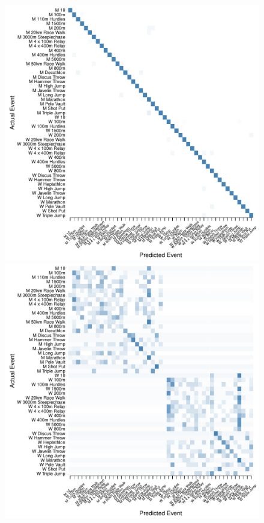 \begin{figure}
\begin{center}
\begin{minipage}{0.20\textwidth}
\begin{center}
    \end{center}
  \end{minipage}
    \hspace{0.05\textwidth}
    \begin{minipage}{0.20\textwidth}
    \begin{center}
      \includegraphics[scale=0.20]{../graphics/athletesRF-trn.pdf}
    \end{center}
  \end{minipage}
  \hspace{0.05\textwidth}
  \begin{minipage}{0.20\textwidth}
    \begin{center}
      \includegraphics[scale=0.20]{../graphics/athletesRF-tst.pdf}

\end{center}
\end{minipage}
\end{center}
\end{figure}
